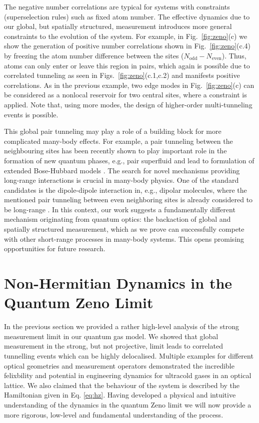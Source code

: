 The negative number correlations are typical for systems with
constraints (superselection rules) such as fixed atom number. The
effective dynamics due to our global, but spatially structured,
measurement introduces more general constraints to the evolution of
the system. For example, in Fig.~\ref{fig:zeno}(c) we show the
generation of positive number correlations shown in
Fig.~\ref{fig:zeno}(c.4) by freezing the atom number difference
between the sites ($N_\text{odd}-N_\text{even}$). Thus, atoms can only
enter or leave this region in pairs, which again is possible due to
correlated tunneling as seen in Figs.~\ref{fig:zeno}(c.1,c.2) and
manifests positive correlations. As in the previous example, two edge
modes in Fig.~\ref{fig:zeno}(c) can be considered as a nonlocal
reservoir for two central sites, where a constraint is applied. Note
that, using more modes, the design of higher-order multi-tunneling
events is possible.

This global pair tunneling may play a role of a building block for
more complicated many-body effects. For example, a pair tunneling
between the neighbouring sites has been recently shown to play
important role in the formation of new quantum phases, e.g., pair
superfluid \cite{sowinski2012} and lead to formulation of extended
Bose-Hubbard models \cite{omjyoti2015}. The search for novel
mechanisms providing long-range interactions is crucial in many-body
physics. One of the standard candidates is the dipole-dipole
interaction in, e.g., dipolar molecules, where the mentioned pair
tunneling between even neighboring sites is already considered to be
long-range \cite{sowinski2012,omjyoti2015}. In this context, our work
suggests a fundamentally different mechanism originating from quantum
optics: the backaction of global and spatially structured measurement,
which as we prove can successfully compete with other short-range
processes in many-body systems. This opens promising opportunities for
future research.

\section{Non-Hermitian Dynamics in the Quantum Zeno Limit}

In the previous section we provided a rather high-level analysis of
the strong measurement limit in our quantum gas model. We showed that
global measurement in the strong, but not projective, limit leads to
correlated tunnelling events which can be highly delocalised. Multiple
examples for different optical geometries and measurement operators
demonstrated the incredible felixbility and potential in engineering
dynamics for ultracold gases in an optical lattice. We also claimed
that the behaviour of the system is described by the Hamiltonian given
in Eq. \eqref{eq:hz}. Having developed a physical and intuitive
understanding of the dynamics in the quantum Zeno limit we will now
provide a more rigorous, low-level and fundamental understanding of
the process.

